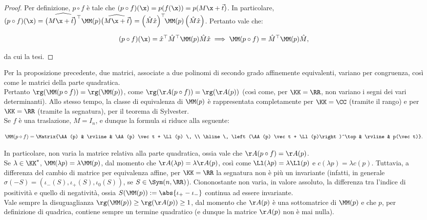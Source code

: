 \documentclass[11pt]{article}
\begin{document}
	\begin{proof}
		Per definizione, $p \circ f$ è tale che $(p \circ f)(\x) = p(f(\x)) =
		p(M\x + \vec t)$. In particolare, $(p \circ f)(\x) = \widehat{\left( M \x + \vec t \right)^\top} \MM(p) \widehat{\left( M \x + \vec t \right)} = \left( \hat M \hat x \right)^\top \!\! \MM(p) \left( \hat M \hat x \right)$. Pertanto vale che:
		
		\[ (p \circ f)(\x) = \hat x^\top \hat M^\top \MM(p) \hat M \hat x \implies \MM(p \circ f) = {\hat M}^\top \MM(p) \hat M, \]
		
		\vskip 0.05in
		
		da cui la tesi.
	\end{proof}

	\begin{remark}\nl
		\li Per la proposizione precedente, due matrici, associate a due
		polinomi di secondo grado affinemente equivalenti, variano
		per congruenza, così come le matrici della parte quadratica. \\
		
		Pertanto $\rg(\MM(p \circ f)) = \rg(\MM(p))$, come $\rg(\AA(p \circ f))
		= \rg(\AA(p))$ (così come, per $\KK=\RR$, non variano i segni
		dei vari determinanti). Allo stesso
		tempo, la classe di equivalenza di $\MM(p)$ è rappresentata completamente per $\KK = \CC$ (tramite il rango) e per $\KK = \RR$
		(tramite la segnatura), per il teorema di Sylvester. \\

		\li Se $f$ è una traslazione, $M = I_n$, e dunque la formula
		si riduce alla seguente:
		
		\[ \MM(p \circ f) = \Matrix{\AA(p) & \rvline & \AA(p) \vec t + \Ll(p) \, \\ \hline \, \left(\AA(p) \vec t + \Ll(p)\right)^\top & \rvline & p(\vec t)}. \]
		
		\vskip 0.05in
		
		In particolare, non varia la matrice relativa alla parte quadratica,
		ossia vale che $\AA(p \circ f) = \AA(p)$. \\
		
		\li Se $\lambda \in \KK^*$, $\MM(\lambda p) = \lambda \MM(p)$, dal
		momento che $\AA(\lambda p) = \lambda \AA(p)$, così come
		$\Ll(\lambda p) = \lambda \Ll(p)$ e $c(\lambda p) = \lambda c(p)$.
		Tuttavia, a differenza del cambio di matrice per equivalenza
		affine, per $\KK=\RR$ la segnatura non è più un invariante (infatti, in generale $\sigma(-S) = (\iota_-(S), \iota_+(S), \iota_0(S))$, se $S \in \Sym(n, \RR)$). Ciononostante non varia, in valore assoluto, la differenza tra l'indice di positività
		e quello di negatività, ossia $S(\MM(p)) := \abs{\iota_+ - \iota_-}$ continua ad essere invariante. \\
		
		\li Vale sempre la disuguaglianza $\rg(\MM(p)) \geq \rg(\AA(p)) \geq 1$, dal momento che $\AA(p)$ è
		una sottomatrice di $\MM(p)$ e che $p$, per definizione
		di quadrica, contiene sempre un termine quadratico
		(e dunque la matrice $\AA(p)$ non è mai nulla).
	\end{remark}
\end{document}
